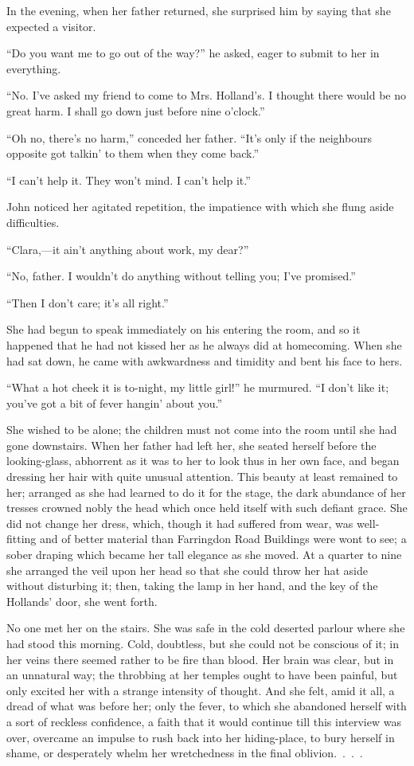 In the evening, when her father returned, she surprised him by saying
that she expected a visitor.

``Do you want me to go out of the way?'' he asked, eager to submit to
her in everything.

``No. I've asked my friend to come to Mrs. Holland's. I thought there
would be no great harm. I shall go down just before nine o'clock.''

``Oh no, there's no harm,'' conceded her
{\protect\hypertarget{76}{}{}}father. ``It's only if the neighbours
opposite got talkin' to them when they come back.''

``I can't help it. They won't mind. I can't help it.''

John noticed her agitated repetition, the impatience with which she
flung aside difficulties.

``Clara,---it ain't anything about work, my dear?''

``No, father. I wouldn't do anything without telling you; I've
promised.''

``Then I don't care; it's all right.''

She had begun to speak immediately on his entering the room, and so it
happened that he had not kissed her as he always did at homecoming. When
she had sat down, he came with awkwardness and timidity and bent his
face to hers.

``What a hot cheek it is to-night, my little girl!'' he murmured. ``I
don't like it; you've got a bit of fever hangin' about you.''

She wished to be alone; the children must not come into the room until
she had gone downstairs. When her father had left her, she seated
herself before the looking-glass, abhorrent as it was to her to look
thus in her own face, and began dressing her hair with
{\protect\hypertarget{77}{}{}}quite unusual attention. This beauty at
least remained to her; arranged as she had learned to do it for the
stage, the dark abundance of her tresses crowned nobly the head which
once held itself with such defiant grace. She did not change her dress,
which, though it had suffered from wear, was well-fitting and of better
material than Farringdon Road Buildings were wont to see; a sober
draping which became her tall elegance as she moved. At a quarter to
nine she arranged the veil upon her head so that she could throw her hat
aside without disturbing it; then, taking the lamp in her hand, and the
key of the Hollands' door, she went forth.

No one met her on the stairs. She was safe in the cold deserted parlour
where she had stood this morning. Cold, doubtless, but she could not be
conscious of it; in her veins there seemed rather to be fire than blood.
Her brain was clear, but in an unnatural way; the throbbing at her
temples ought to have been painful, but only excited her with a strange
intensity of thought. And she felt, amid it all, a dread of what was
before her; only the fever, to which she abandoned herself with a
{\protect\hypertarget{78}{}{}}sort of reckless confidence, a faith that
it would continue till this interview was over, overcame an impulse to
rush back into her hiding-place, to bury herself in shame, or
desperately whelm her wretchedness in the final {oblivion{.~.~.~.}}

